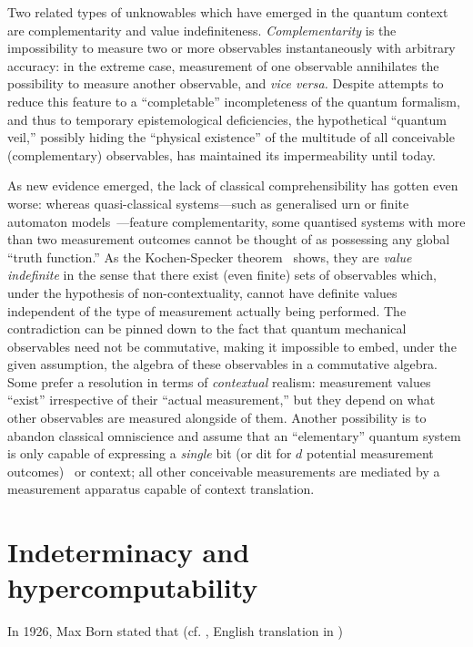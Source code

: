 \documentclass[11pt, pra,amsfonts,showpacs,showkeys]{revtex4}%
\begin{document}
 Two related types of unknowables which have  emerged in the quantum context are
complementarity and value indefiniteness.
{\em Complementarity} is the impossibility to measure two or more observables instantaneously with arbitrary accuracy:
in the extreme case, measurement of one observable annihilates the possibility to measure another observable, and {\it vice versa.}
Despite attempts to reduce this feature to a ``completable'' incompleteness of the quantum formalism,
and thus to temporary epistemological deficiencies,
the hypothetical ``quantum veil,'' possibly hiding the ``physical existence'' of the multitude of all conceivable (complementary) observables, has maintained its impermeability until today.

As new evidence emerged,  the lack of classical comprehensibility  has gotten even worse:
whereas quasi-classical systems---such as generalised urn or finite automaton models~\cite{svozil-2008-ql}---feature complementarity, some
quantised systems with more than two measurement outcomes cannot be thought of as possessing any global ``truth function.''
As the Kochen-Specker theorem~\cite{specker-60,kochen1} shows,
they are {\em value indefinite} in the sense that there exist  (even finite) sets of observables which, under the hypothesis of non-contextuality,  cannot have definite values
independent of the type of measurement
actually being performed.
 The contradiction can be pinned down to the fact that quantum mechanical observables need not be commutative, making it impossible to embed, under the given assumption, the algebra of these observables in a commutative algebra.
Some prefer a resolution in terms of {\em  contextual} realism:
measurement values ``exist'' irrespective of their ``actual measurement,''
but they depend on what other observables are measured alongside of them.
Another possibility is to abandon classical omniscience
and assume that an ``elementary'' quantum system is only capable
of expressing a {\em single} bit (or dit for $d$ potential measurement outcomes)~\cite{zeil-99}
or context; all other conceivable measurements are mediated by a measurement apparatus capable of
context translation.




\section{Indeterminacy and hypercomputability}

In 1926, Max Born stated that (cf. \cite[p.~866]{born-26-1}, English translation in \cite[p.~54]{wheeler-Zurek:83})
\end{document}
